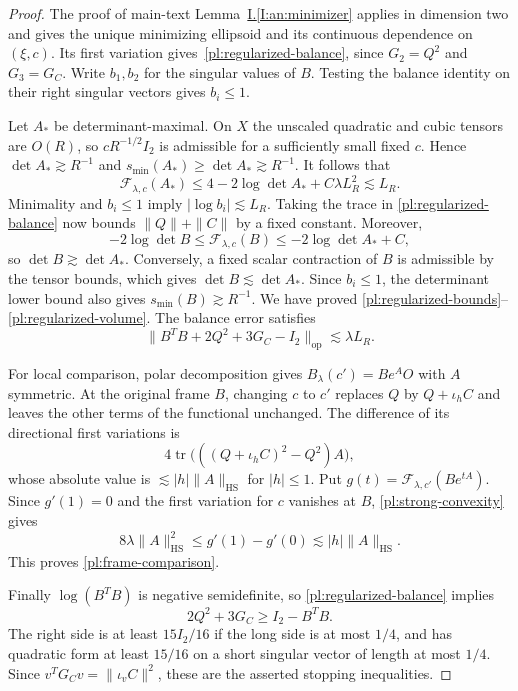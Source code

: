 \documentclass[11pt]{amsart}
\theoremstyle{definition}
\theoremstyle{remark}
\numberwithin{equation}{section}
\newcommand{\partIref}[1]{\hyperref[I:#1]{I.\ref*{I:#1}}}
\begin{document}
\begin{proof}
The proof of main-text Lemma~\partIref{an:minimizer} applies in dimension two and gives the unique minimizing ellipsoid and its continuous dependence on $(\xi,c)$. Its first variation gives~\eqref{pl:regularized-balance}, since $G_2=Q^2$ and $G_3=G_C$. Write $b_1,b_2$ for the singular values of $B$. Testing the balance identity on their right singular vectors gives $b_i\le1$.

Let $A_*$ be determinant-maximal. On $X$ the unscaled quadratic and cubic tensors are $O(R)$, so $cR^{-1/2}I_2$ is admissible for a sufficiently small fixed $c$. Hence $\det A_*\gtrsim R^{-1}$ and $s_{\min}(A_*)\ge\det A_*\gtrsim R^{-1}$. It follows that
\[
\mathcal F_{\lambda,c}(A_*)\le4-2\log\det A_*+C\lambda L_R^2\lesssim L_R.
\]
Minimality and $b_i\le1$ imply $|\log b_i|\lesssim L_R$. Taking the trace in \eqref{pl:regularized-balance} now bounds $\|Q\|+\|C\|$ by a fixed constant. Moreover,
\[
-2\log\det B\le\mathcal F_{\lambda,c}(B)
\le-2\log\det A_*+C,
\]
so $\det B\gtrsim\det A_*$. Conversely, a fixed scalar contraction of $B$ is admissible by the tensor bounds, which gives $\det B\lesssim\det A_*$. Since $b_i\le1$, the determinant lower bound also gives $s_{\min}(B)\gtrsim R^{-1}$. We have proved \eqref{pl:regularized-bounds}--\eqref{pl:regularized-volume}. The balance error satisfies
\begin{equation}\label{pl:balance-error}
\|B^TB+2Q^2+3G_C-I_2\|_{\mathrm{op}}
\lesssim\lambda L_R.
\end{equation}

For local comparison, polar decomposition gives $B_\lambda(c')=Be^AO$ with $A$ symmetric. At the original frame $B$, changing $c$ to $c'$ replaces $Q$ by $Q+\iota_hC$ and leaves the other terms of the functional unchanged. The difference of its directional first variations is
\[
4\operatorname{tr}\bigl(((Q+\iota_hC)^2-Q^2)A\bigr),
\]
whose absolute value is $\lesssim |h|\|A\|_{\mathrm{HS}}$ for $|h|\le1$. Put $g(t)=\mathcal F_{\lambda,c'}(Be^{tA})$. Since $g'(1)=0$ and the first variation for $c$ vanishes at $B$, \eqref{pl:strong-convexity} gives
\[
8\lambda\|A\|_{\mathrm{HS}}^2
\le g'(1)-g'(0)
\lesssim |h|\|A\|_{\mathrm{HS}}.
\]
This proves \eqref{pl:frame-comparison}.

Finally $\log(B^TB)$ is negative semidefinite, so \eqref{pl:regularized-balance} implies
\[
2Q^2+3G_C\ge I_2-B^TB.
\]
The right side is at least $15I_2/16$ if the long side is at most $1/4$, and has quadratic form at least $15/16$ on a short singular vector of length at most $1/4$. Since $v^TG_Cv=\|\iota_vC\|^2$, these are the asserted stopping inequalities.
\end{proof}
\end{document}

